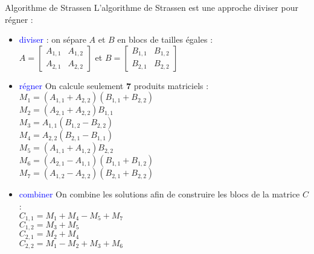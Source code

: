 \documentclass[10pt]{beamer}
\begin{document}
\begin{frame}[fragile]{\Ctitle}{\stitle}
	\begin{exampleblock}{Algorithme de Strassen}
		{\small L'algorithme de Strassen est une approche diviser pour régner :}
				\begin{itemize}
					\item<2->{\small \textcolor{blue}{diviser} : on sépare $A$ et $B$ en blocs de tailles égales : \\
						$A =
							\begin{bmatrix}
								A_{1,1} & A_{1,2} \\
								A_{2,1} & A_{2,2}
							\end{bmatrix}$ et
						$B =
							\begin{bmatrix}
								B_{1,1} & B_{1,2} \\
								B_{2,1} & B_{2,2}
							\end{bmatrix}$}
			\item<3->{\small \textcolor{blue}{régner} On calcule \textcolor{BrickRed}{seulement \textbf{7}} produits matriciels : \\
$M_{1} = (A_{1,1} + A_{2,2}) (B_{1,1} + B_{2,2})$ \\
$M_{2} = (A_{2,1} + A_{2,2}) B_{1,1}$\\
$M_{3} = A_{1,1} (B_{1,2} - B_{2,2})$\\
$M_{4} = A_{2,2} (B_{2,1} - B_{1,1})$\\
$M_{5} = (A_{1,1} + A_{1,2}) B_{2,2}$\\
$M_{6} = (A_{2,1} - A_{1,1}) (B_{1,1} + B_{1,2})$\\
$M_{7} = (A_{1,2} - A_{2,2}) (B_{2,1} + B_{2,2})$}
			\item<4->{\small \textcolor{blue}{combiner} On combine les solutions afin de construire les blocs de la matrice $C$ :\\
			$C_{1,1} = M_{1} + M_{4} - M_{5} + M_{7}$\\
			$C_{1,2} = M_{3} + M_{5}$\\
			$C_{2,1} = M_{2} + M_{4}$\\
			$C_{2,2} = M_{1} - M_{2} + M_{3} + M_{6}$}
\end{itemize}
	\end{exampleblock}
\end{frame}
\end{document}
